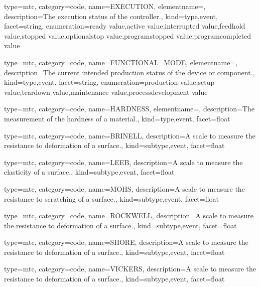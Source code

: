 {
  type=mtc,
  category=code,
  name={EXECUTION},
  elementname=,
  description={The execution status of the \gls{controller}.},
  kind={type,event},
  facet={\gls{string}},
  enumeration={\gls{ready value},\gls{active value},\gls{interrupted value},\gls{feedhold value},\gls{stopped value},\gls{optionalstop value},\gls{programstopped value},\gls{programcompleted value}}
}


{
  type=mtc,
  category=code,
  name={FUNCTIONAL\_MODE},
  elementname=,
  description={The current intended production status of the device or component.},
  kind={type,event},
  facet={\gls{string}},
  enumeration={\gls{production value},\gls{setup value},\gls{teardown value},\gls{maintenance value},\gls{processdevelopment value}}
}


{
  type=mtc,
  category=code,
  name={HARDNESS},
  elementname=,
  description={The measurement of the hardness of a material.},
  kind={type,event},
  facet={\gls{float}}
}


{
  type=mtc,
  category=code,
  name={BRINELL},
  description={A scale to measure the resistance to deformation of a surface.},
  kind={subtype,event},
  facet={\gls{float}}
}


{
  type=mtc,
  category=code,
  name={LEEB},
  description={A scale to measure the elasticity of a surface.},
  kind={subtype,event},
  facet={\gls{float}}
}


{
  type=mtc,
  category=code,
  name={MOHS},
  description={A scale to measure the resistance to scratching of a surface.},
  kind={subtype,event},
  facet={\gls{float}}
}


{
  type=mtc,
  category=code,
  name={ROCKWELL},
  description={A scale to measure the resistance to deformation of a surface.},
  kind={subtype,event},
  facet={\gls{float}}
}


{
  type=mtc,
  category=code,
  name={SHORE},
  description={A scale to measure the resistance to deformation of a surface.},
  kind={subtype,event},
  facet={\gls{float}}
}


{
  type=mtc,
  category=code,
  name={VICKERS},
  description={A scale to measure the resistance to deformation of a surface.},
  kind={subtype,event},
  facet={\gls{float}}
}


